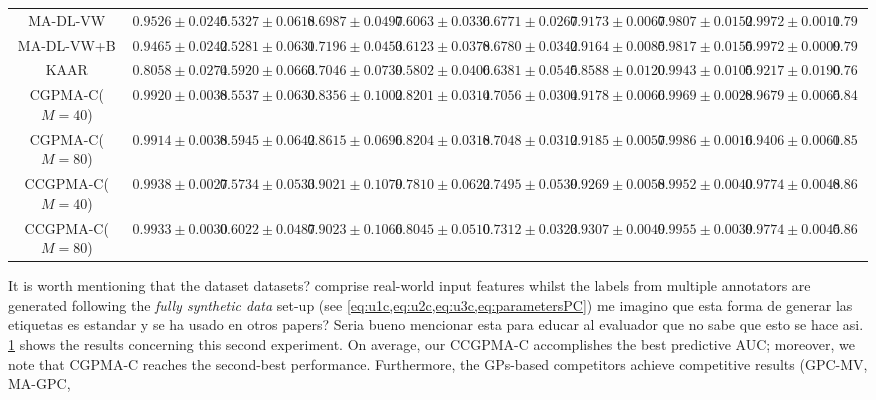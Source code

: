 \documentclass[journal]{IEEEtran}
\newcommand{\comment}[2]{{\color{blue}#1} {\color{red}#2}}
\begin{document}
\begin{table}[!htb]
{\begin{tabular}{cccccccccc}
        MA-DL-VW        &$0.9526\pm0.0245$ & $0.5327\pm0.0618$ & $0.6987\pm0.0497$ & $0.6063\pm0.0336$ & $0.6771\pm0.0267$ & $0.9173\pm0.0067$ &$0.9807\pm0.0152$& $\mathbf{0.9972\pm0.0011}$& $0.7953$\\ 
        MA-DL-VW+B      &$0.9465\pm0.0242$ & $0.5281\pm0.0631$ & $0.7196\pm0.0453$ & $0.6123\pm0.0378$ & $0.6780\pm0.0342$ & $0.9164\pm0.0085$ &$0.9817\pm0.0155$& $\mathbf{0.9972\pm0.0009}$& $0.7975$\\ 
        KAAR            &$0.8058\pm0.0274$ & $0.5920\pm0.0663$ & $0.7046\pm0.0739$ & $0.5802\pm0.0406$ & $0.6381\pm0.0545$ & $0.8588\pm0.0120$ &$0.9943\pm0.0105$& $0.9217\pm0.0190$& $0.7619$\\ 
        CGPMA-C($M=40$) &$0.9920\pm0.0038$ & $0.5537\pm0.0630$ & $0.8356\pm0.1002$ & $0.8201\pm0.0314$ & $0.7056\pm0.0304$ & $0.9178\pm0.0066$ &$0.9969\pm0.0028$& $0.9679\pm0.0065$& $0.8487$\\ 
        CGPMA-C($M=80$) &$0.9914\pm0.0038$ & $0.5945\pm0.0642$ & $0.8615\pm0.0696$ & $\mathbf{0.8204\pm0.0318}$ & $0.7048\pm0.0312$ & $0.9185\pm0.0057$ &$\mathbf{0.9986\pm0.0016}$& $0.9406\pm0.0061$& $0.8538$\\ 
        CCGPMA-C($M=40$)&$\mathbf{0.9938\pm0.0027}$ & $0.5734\pm0.0533$ & $0.9021\pm0.1079$ & $0.7810\pm0.0622$ & $\mathbf{0.7495\pm0.0539}$ & $0.9269\pm0.0058$ &$0.9952\pm0.0040$& $0.9774\pm0.0048$& $0.8624$\\ 
        CCGPMA-C($M=80$)&$0.9933\pm0.0030$ & $\mathbf{0.6022\pm0.0487}$ & $\mathbf{0.9023\pm0.1066}$ & $0.8045\pm0.0510$ & $0.7312\pm0.0323$ & $\mathbf{0.9307\pm0.0049}$ &$0.9955\pm0.0039$& $0.9774\pm0.0045$& $\mathbf{0.8671}$\\\bottomrule
	\end{tabular}}
	\label{tab:SSClaResults}
\end{table}
It is worth mentioning that the \comment{dataset}{datasets?} comprise real-world input
features whilst the labels from multiple annotators are
\comment{}{generated} following the
\textit{fully synthetic data} \comment{set-up (see
\cref{eq:u1c,eq:u2c,eq:u3c,eq:parametersPC})}{me imagino que esta
forma de generar las etiquetas es estandar y se ha usado en otros
papers? Seria bueno mencionar esta para educar al evaluador que no
sabe que esto se hace asi}. \cref{tab:SSClaResults}
shows the results concerning this second experiment. On average, our
CCGPMA-C accomplishes the best predictive AUC; moreover, we note that
CGPMA-C reaches the second-best performance. Furthermore, the
GPs-based competitors achieve competitive results (GPC-MV, MA-GPC,
\end{document}
